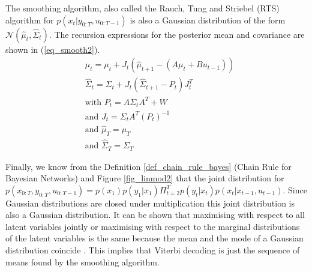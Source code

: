 The smoothing algorithm, also called the Rauch, Tung and Striebel (RTS) algorithm for $p(x_t|y_{0:T},u_{0:T-1})$ is also a Gaussian distribution of the form $\mathcal{N}(\hat{\mu}_t, \hat{\Sigma}_t)$. The recursion expressions for the posterior mean and covariance are shown in (\ref{eq_smooth2}).
\begin{equation}
\begin{aligned}
&\hat{\mu}_t = \mu_t + J_t\left(\hat{\mu}_{t+1}-(A\mu_t+Bu_{t-1})\right) \\
&\hat{\Sigma}_t = \Sigma_t + J_t(\hat{\Sigma}_{t+1}-P_t)J^T_t \\
&\text{with } P_t = A\Sigma_tA^T + W \\
&\text{and } J_t = \Sigma_t A^T (P_t)^{-1}\\
&\text{and } \hat{\mu}_T = \mu_T\\
&\text{and } \hat{\Sigma}_T = \Sigma_T
\end{aligned}
\label{eq_smooth2}
\end{equation}

Finally, we know from the Definition \ref{def_chain_rule_bayes} (Chain Rule for Bayesian Networks) and Figure \ref{fig_linmod2} that the joint distribution for $p(x_{0:T},y_{0:T}, u_{0:T-1}) = p(x_1)p(y_1|x_1)\Pi^T_{t=2} p(y_t|x_t)p(x_{t}|x_{t-1},u_{t-1})$. Since Gaussian distributions are closed under multiplication this joint distribution is also a Gaussian distribution. It can be shown that maximising with respect to all latent variables jointly or maximising with respect to the marginal distributions of the latent variables is the same because the mean and the mode of a Gaussian distribution coincide \cite{barber}. This implies that Viterbi decoding is just the sequence of means found by the smoothing algorithm.

